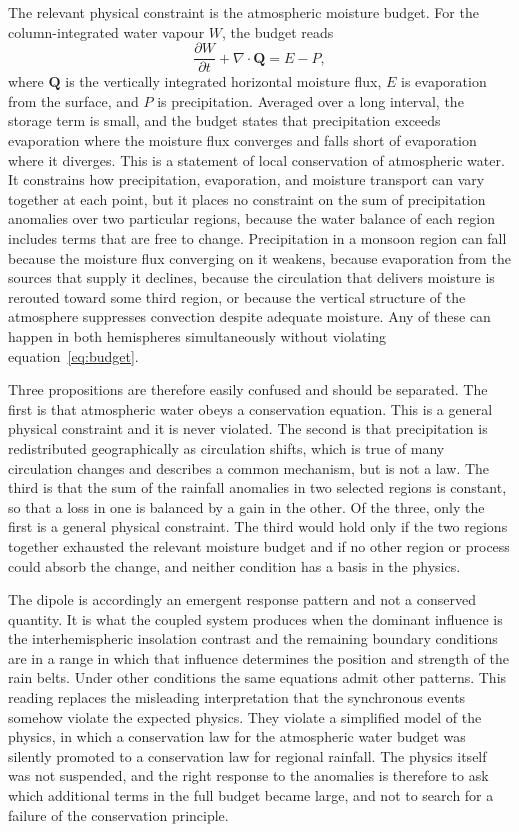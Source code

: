 \documentclass[11pt]{article}
\theoremstyle{definition}
\newcommand{\bQ}{\mathbf{Q}}
\begin{document}
The relevant physical constraint is the atmospheric moisture budget. For the column-integrated water vapour $W$, the budget reads
\begin{equation}
\frac{\partial W}{\partial t} + \nabla\cdot\bQ = E - P,
\label{eq:budget}
\end{equation}
where $\bQ$ is the vertically integrated horizontal moisture flux, $E$ is evaporation from the surface, and $P$ is precipitation. Averaged over a long interval, the storage term is small, and the budget states that precipitation exceeds evaporation where the moisture flux converges and falls short of evaporation where it diverges. This is a statement of local conservation of atmospheric water. It constrains how precipitation, evaporation, and moisture transport can vary together at each point, but it places no constraint on the sum of precipitation anomalies over two particular regions, because the water balance of each region includes terms that are free to change. Precipitation in a monsoon region can fall because the moisture flux converging on it weakens, because evaporation from the sources that supply it declines, because the circulation that delivers moisture is rerouted toward some third region, or because the vertical structure of the atmosphere suppresses convection despite adequate moisture. Any of these can happen in both hemispheres simultaneously without violating equation~\eqref{eq:budget}.

Three propositions are therefore easily confused and should be separated. The first is that atmospheric water obeys a conservation equation. This is a general physical constraint and it is never violated. The second is that precipitation is redistributed geographically as circulation shifts, which is true of many circulation changes and describes a common mechanism, but is not a law. The third is that the sum of the rainfall anomalies in two selected regions is constant, so that a loss in one is balanced by a gain in the other. Of the three, only the first is a general physical constraint. The third would hold only if the two regions together exhausted the relevant moisture budget and if no other region or process could absorb the change, and neither condition has a basis in the physics.

The dipole is accordingly an emergent response pattern and not a conserved quantity. It is what the coupled system produces when the dominant influence is the interhemispheric insolation contrast and the remaining boundary conditions are in a range in which that influence determines the position and strength of the rain belts. Under other conditions the same equations admit other patterns. This reading replaces the misleading interpretation that the synchronous events somehow violate the expected physics. They violate a simplified model of the physics, in which a conservation law for the atmospheric water budget was silently promoted to a conservation law for regional rainfall. The physics itself was not suspended, and the right response to the anomalies is therefore to ask which additional terms in the full budget became large, and not to search for a failure of the conservation principle.
\end{document}
